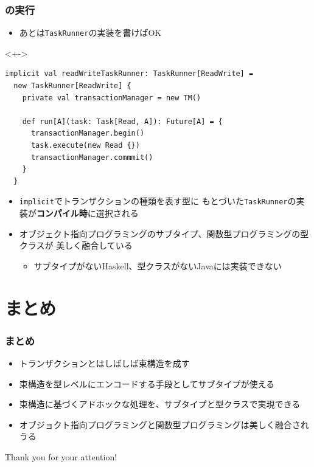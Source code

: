 \begin{frame}[fragile]
  \frametitle{\Fujitask の実行}

  \begin{itemize}
    \item<+-> あとは\lstinline|TaskRunner|の実装を書けばOK
  \end{itemize}

  \begin{uncoverenv}<+->
\begin{lstlisting}[style=scala]
implicit val readWriteTaskRunner: TaskRunner[ReadWrite] =
  new TaskRunner[ReadWrite] {
    private val transactionManager = new TM()
    
    def run[A](task: Task[Read, A]): Future[A] = {
      transactionManager.begin()
      task.execute(new Read {})
      transactionManager.commmit()
    }
  }
\end{lstlisting}
  \end{uncoverenv}

  \begin{itemize}
    \item<+-> \lstinline|implicit|でトランザクションの種類を表す型に
    もとづいた\lstinline|TaskRunner|の実装が\textbf{コンパイル時}に選択される

    \item<+-> オブジェクト指向プログラミングのサブタイプ、関数型プログラミングの型クラスが
    美しく融合している
    \begin{itemize}
      \item サブタイプがないHaskell、型クラスがないJavaに\Fujitask は実装できない
    \end{itemize}
  \end{itemize}
\end{frame}

\section{まとめ}

\begin{frame}
  \frametitle{まとめ}

  \pause
  \begin{itemize}
    \item<+-> トランザクションとはしばしば束構造を成す
    \item<+-> 束構造を型レベルにエンコードする手段としてサブタイプが使える
    \item<+-> 束構造に基づくアドホックな処理を、サブタイプと型クラスで実現できる
    \item<+-> オブジョクト指向プログラミングと関数型プログラミングは美しく融合されうる
  \end{itemize}
\end{frame}

\begin{frame}
  \centering
  {\Huge Thank you for your attention!}
\end{frame}



